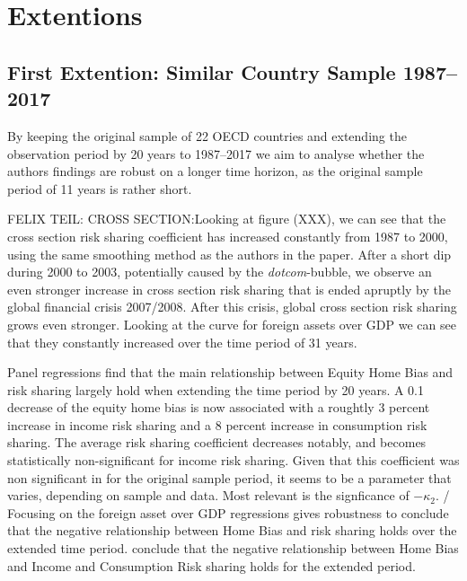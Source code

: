 \documentclass[12pt,a4paper]{article}
\begin{document}
\label{5_orig_data}
\section{Extentions}

\subsection{First Extention: Similar Country Sample 1987--2017}
By keeping the original sample of 22 OECD countries and extending the observation period by 20 years to 1987--2017 we aim to analyse whether the authors findings 
are robust on a longer time horizon, as the original sample period of 11 years is rather short. 

FELIX TEIL: CROSS SECTION:Looking at figure (XXX), we can see that the cross section risk sharing coefficient has increased constantly from 1987
to 2000, using the same smoothing method as the authors in the paper. After a short dip during 2000 to 2003, potentially caused
by the \textit{dotcom}-bubble, we observe an even stronger increase in cross section risk sharing that is ended apruptly by the 
global financial crisis 2007/2008. After this crisis, global cross section risk sharing grows even stronger. 
Looking at the curve for foreign assets over GDP we can see that they constantly increased over the time period of 31 years. 

Panel regressions find that the main relationship between Equity Home Bias and risk sharing largely hold when extending the 
time period by 20 years. A 0.1 decrease of the equity home bias is now associated with a roughtly 3 percent increase 
in income risk sharing and a 8 percent increase in consumption risk sharing. The average risk sharing coefficient decreases notably, and becomes 
statistically non-significant for income risk sharing. Given that this coefficient was non significant in \textcite{main} for the original sample period, 
it seems to be a parameter that varies, depending on sample and data. Most relevant is the signficance of \(-\kappa_2\). /
Focusing on the foreign asset over GDP regressions gives robustness to conclude that the negative relationship between Home Bias and risk sharing holds over the extended time period.
conclude that the negative relationship between Home Bias and Income and Consumption Risk sharing holds for the extended period.
\end{document}
